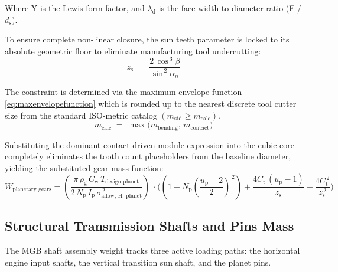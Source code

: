 \begin{itemize}
                Where Y is the Lewis form factor, and $\lambda_{\text{d}}$ is the face-width-to-diameter ratio (F / $d_{\text{s}}$).  

                To ensure complete non-linear closure, the sun teeth parameter is locked to its absolute geometric floor 
                to eliminate manufacturing tool undercutting:
                    \begin{equation}
                        \label{eq:zs}
                        z_{\text{s}}
                        \;=\;
                        \frac{2\,\cos^{\,3}\beta}{\sin^{\,2}\alpha_{n}}
                    \end{equation}

                The constraint is determined via the maximum envelope function \autoref{eq:maxenvelopefunction}
                which is rounded up to the nearest discrete tool cutter size from 
                the standard ISO-metric catalog \((m_{\text{std}} \ge m_{\text{calc}})\).
                    \begin{equation}
                        \label{eq:maxenvelopefunction}
                        m_{\text{calc}}
                        \;=\;
                        \max\!\bigl(m_{\text{bending}},\,m_{\text{contact}}\bigr)
                    \end{equation}

                Substituting the dominant contact-driven module expression into the cubic core completely eliminates 
                the tooth count placeholders from the baseline diameter, yielding the substituted gear mass function:
                    \begin{equation}
                    \label{eq:planetarygearsmass}
                    W_{\text{planetary gears}}
                    =
                    \left(\frac{\pi\,\rho_{\text{g}}\,C_{\text{w}}\,T_{\text{design planet}}}
                    {2\,N_{\text{p}}\,I_{\text{p}}\,
                    \sigma_{\text{allow, H, planet}}^{\,2}}\right)
                    \;\cdot
                    \bigl(\left( 1 + N_{\text{p}}
                    \left(\frac{u_{\text{p}}-2}{2}\right)^{\,2}\right)
                    + \frac{4C_{\text{t}}\,(u_{\text{p}}-1)}{z_{\text{s}}}
                    + \frac{4C_{\text{t}}^{\,2}}{z_{\text{s}}^{\,2}}\bigr)
                    \end{equation}
                \end{itemize}

    \subsection{Structural Transmission Shafts and Pins Mass}
        The MGB shaft assembly weight tracks three active loading paths: the horizontal engine input shafts, the 
        vertical transition sun shaft, and the planet pins.

